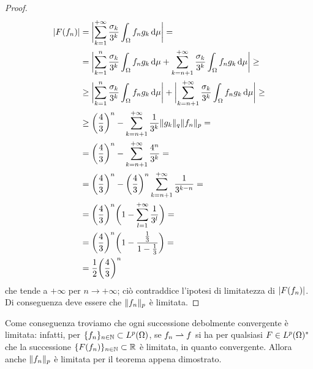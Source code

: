 \begin{proof}
    \begin{equation}
        \begin{split}
            \abs{F(f_n)}&=
            \abs[\bigg]{\sum_{k=1}^{+\infty}\frac{\sigma_k}{3^k}\int_\Omega f_ng_k\,\dd\mu}=\\&=
            \abs[\bigg]{\sum_{k=1}^{n}\frac{\sigma_k}{3^k}\int_\Omega f_ng_k\,\dd\mu+\sum_{k=n+1}^{+\infty}\frac{\sigma_k}{3^k}\int_\Omega f_ng_k\,\dd\mu}\ge\\&\ge
            \abs[\bigg]{\sum_{k=1}^{n}\frac{\sigma_k}{3^k}\int_\Omega f_ng_k\,\dd\mu}+\abs[\bigg]{\sum_{k=n+1}^{+\infty}\frac{\sigma_k}{3^k}\int_\Omega f_ng_k\,\dd\mu}\ge\\&\ge
            \biggl(\frac43\biggr)^n-\sum_{k=n+1}^{+\infty}\frac1{3^k}\norm{g_k}_q\norm{f_n}_p=\\&=
            \biggl(\frac43\biggr)^n-\sum_{k=n+1}^{+\infty}\frac{4^n}{3^k}=\\&=
            \biggl(\frac43\biggr)^n-\biggl(\frac43\biggr)^n\sum_{k=n+1}^{+\infty}\frac1{3^{k-n}}=\\&=
            \biggl(\frac43\biggr)^n\biggl(1-\sum_{l=1}^{+\infty}\frac1{3^l}\biggr)=\\&=
            \biggl(\frac43\biggr)^n\biggl(1-\frac{\frac13}{1-\frac13}\biggr)=\\&=
            \frac12\biggl(\frac43\biggr)^n
        \end{split}
    \end{equation}
    che tende a $+\infty$ per $n\to+\infty$; ciò contraddice l'ipotesi di limitatezza di $\abs{F(f_n)}$.
    Di conseguenza deve essere che $\norm{f_n}_p$ è limitata.
\end{proof}
Come conseguenza troviamo che ogni successione debolmente convergente è limitata: infatti, per $\{f_n\}_{n\in\N}\subset\leb[p]{\Omega}$, se $f_n\weakto f$ si ha per qualsiasi $F\in\dual{\leb[p]{\Omega}}$ che la successione $\{F(f_n)\}_{n\in\N}\subset\R$ è limitata, in quanto convergente.
Allora anche $\norm{f_n}_p$ è limitata per il teorema appena dimostrato.

